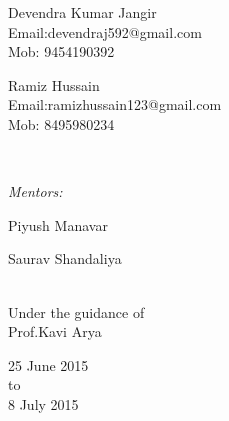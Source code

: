 \documentclass[report]{res}
\begin{document}
\begin{titlepage}
\begin{minipage}{0.4\textwidth}
\begin{flushleft}
	{\large Devendra Kumar Jangir} \\  Email:devendraj592@gmail.com
\\Mob: 9454190392 \\
\end{flushleft}
\begin{flushleft}
	{\large Ramiz Hussain \\} Email:ramizhussain123@gmail.com \\Mob: 8495980234
\end{flushleft}
\end{minipage}
~
\begin{minipage}{0.4\textwidth}
\begin{flushright} \large
\emph{Mentors:} \\
\end{flushright}
\begin{flushright}
{\large Piyush Manavar\\} 
\end{flushright}
\begin{flushright}
{\large Saurav Shandaliya \\} %
\end{flushright}
\end{minipage}\\[2cm]

{ Under the guidance of\\ \large{ Prof.Kavi Arya\\[3cm]}} %


{\large 25 June 2015  \\ to \\ 8 July 2015}\\[3cm] %


 

\vfill %

\end{titlepage}
\end{document}
